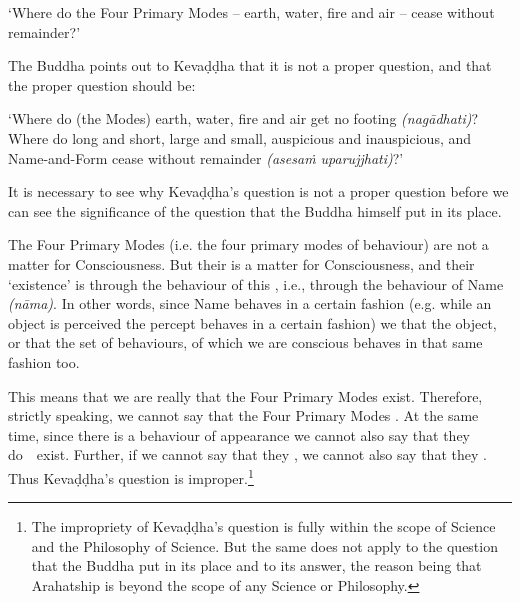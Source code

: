 `Where do the Four Primary Modes -- earth, water, fire and air -- cease without remainder?'

The Buddha points out to Kevaḍḍha that it is not a proper question, and that the proper question should be:

`Where do (the Modes) earth, water, fire and air get no footing \emph{(nagādhati)}? Where do long and short, large and small, auspicious and inauspicious, and Name-and-Form cease without remainder \emph{(asesaṁ uparujjhati)}?'

It is necessary to see why Kevaḍḍha's question is not a proper question before we can see the significance of the question that the Buddha himself put in its place.

\protect\hypertarget{the-four-primary}{}{}The Four Primary Modes (i.e. the four primary modes of behaviour)  are not a matter for Consciousness. But their  is a matter for Consciousness, and their `existence' is  through the behaviour of this , i.e., through the behaviour of Name \emph{(nāma)}. In other words, since Name behaves in a certain fashion (e.g. while an object is perceived the percept behaves in a certain fashion) we  that the object, or that the set of behaviours, of which we are conscious behaves in that same fashion too.

This means that we are really  that the Four Primary Modes exist. Therefore, strictly speaking, we cannot say that the Four Primary Modes . At the same time, since there is a behaviour of appearance we cannot also say that they do~~exist. Further, if we cannot say that they , we cannot also say that they . Thus Kevaḍḍha's question is improper.\footnote{The impropriety of Kevaḍḍha's question is fully within the scope of Science and the Philosophy of Science. But the same does not apply to the question that the Buddha put in its place and to its answer, the reason being that Arahatship is beyond the scope of any Science or Philosophy.}

